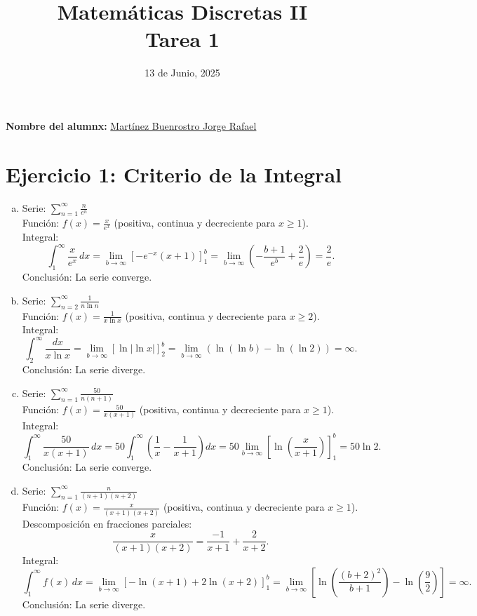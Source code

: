 \documentclass[12pt,a4paper]{article}
\title{Matemáticas Discretas II\\
Tarea 1}
\date{13 de Junio, 2025}
\author{}
\begin{document}
\maketitle

\noindent\textbf{Nombre del alumnx:} \underline{\hspace{0.5cm}Martínez Buenrostro Jorge Rafael\hspace{0.5cm}}

\vspace{1cm}

\section*{Ejercicio 1: Criterio de la Integral}

\begin{enumerate}[a)]
    \item Serie: $\sum_{n=1}^{\infty} \frac{n}{e^n}$ \\
    Función: $f(x) = \frac{x}{e^x}$ (positiva, continua y decreciente para $x \geq 1$). \\
    Integral: 
    \[
    \int_{1}^{\infty} \frac{x}{e^x} \, dx = \lim_{b \to \infty} \left[ -e^{-x}(x+1) \right]_{1}^{b} = \lim_{b \to \infty} \left( -\frac{b+1}{e^b} + \frac{2}{e} \right) = \frac{2}{e}.
    \]
    Conclusión: La serie converge.

    \item Serie: $\sum_{n=2}^{\infty} \frac{1}{n \ln n}$ \\
    Función: $f(x) = \frac{1}{x \ln x}$ (positiva, continua y decreciente para $x \geq 2$). \\
    Integral:
    \[
    \int_{2}^{\infty} \frac{dx}{x \ln x} = \lim_{b \to \infty} \left[ \ln |\ln x| \right]_{2}^{b} = \lim_{b \to \infty} \left( \ln(\ln b) - \ln(\ln 2) \right) = \infty.
    \]
    Conclusión: La serie diverge.

    \item Serie: $\sum_{n=1}^{\infty} \frac{50}{n(n+1)}$ \\
    Función: $f(x) = \frac{50}{x(x+1)}$ (positiva, continua y decreciente para $x \geq 1$). \\
    Integral:
    \[
    \int_{1}^{\infty} \frac{50}{x(x+1)} \, dx = 50 \int_{1}^{\infty} \left( \frac{1}{x} - \frac{1}{x+1} \right) dx = 50 \lim_{b \to \infty} \left[ \ln \left( \frac{x}{x+1} \right) \right]_{1}^{b} = 50 \ln 2.
    \]
    Conclusión: La serie converge.

    \item Serie: $\sum_{n=1}^{\infty} \frac{n}{(n+1)(n+2)}$ \\
    Función: $f(x) = \frac{x}{(x+1)(x+2)}$ (positiva, continua y decreciente para $x \geq 1$). \\
    Descomposición en fracciones parciales:
    \[
    \frac{x}{(x+1)(x+2)} = \frac{-1}{x+1} + \frac{2}{x+2}.
    \]
    Integral:
    \[
    \int_{1}^{\infty} f(x) \, dx = \lim_{b \to \infty} \left[ -\ln(x+1) + 2 \ln(x+2) \right]_{1}^{b} = \lim_{b \to \infty} \left[ \ln \left( \frac{(b+2)^2}{b+1} \right) - \ln \left( \frac{9}{2} \right) \right] = \infty.
    \]
    Conclusión: La serie diverge.
\end{enumerate}
\end{document}
